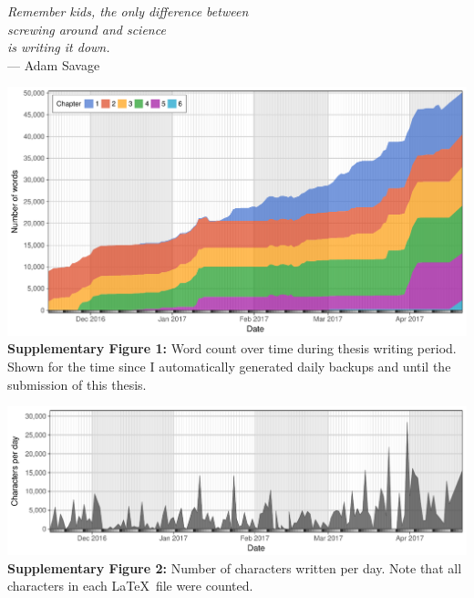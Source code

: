\documentclass[a4paper,twoside]{dphilthesis}
\begin{document}
\vspace*{-14ex}
\begin{flushleft}
\singlespacing
\footnotesize
\textsl{%
Remember kids, the only difference between \\
screwing around and science \\
is writing it down.} \\
\hspace{4cm}--- Adam Savage
\end{flushleft}

\vspace*{2ex}

\begin{flushleft}
\includegraphics[width=\textwidth]{./img/stat_wordcount}
\vspace*{-5ex}
\small\singlespacing\textbf{Supplementary Figure 1:} Word count over time during thesis writing period. Shown for the time since I automatically generated daily backups and until the submission of this thesis.
\end{flushleft}

\vspace*{2ex}

\begin{flushleft}
\includegraphics[width=\textwidth]{./img/stat_charrate}
\vspace*{-5ex}
\small\singlespacing\textbf{Supplementary Figure 2:} Number of characters written per day. Note that all characters in each \LaTeX~file were counted.
\end{flushleft}
\end{document}
